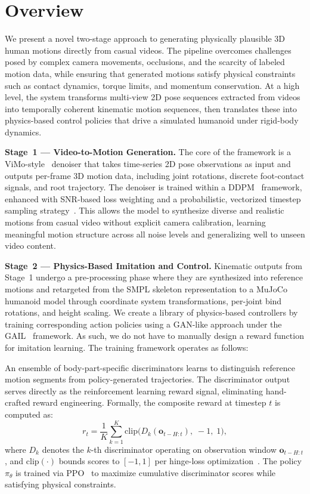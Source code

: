 \section{Overview}
\label{sec:overview}

We present a novel two-stage approach to generating physically plausible 3D human motions directly from casual videos. The pipeline overcomes challenges posed by complex camera movements, occlusions, and the scarcity of labeled motion data, while ensuring that generated motions satisfy physical constraints such as contact dynamics, torque limits, and momentum conservation. At a high level, the system transforms multi-view 2D pose sequences extracted from videos into temporally coherent kinematic motion sequences, then translates these into physics-based control policies that drive a simulated humanoid under rigid-body dynamics.

\textbf{Stage~1 --- Video-to-Motion Generation.} The core of the framework is a ViMo-style~\cite{vimo2024} denoiser that takes time-series 2D pose observations as input and outputs per-frame 3D motion data, including joint rotations, discrete foot-contact signals, and root trajectory. The denoiser is trained within a DDPM~\cite{ddpm2020} framework, enhanced with SNR-based loss weighting and a probabilistic, vectorized timestep sampling strategy~\cite{minsnr2024, ptss2024}. This allows the model to synthesize diverse and realistic motions from casual video without explicit camera calibration, learning meaningful motion structure across all noise levels and generalizing well to unseen video content.

\textbf{Stage~2 --- Physics-Based Imitation and Control.} Kinematic outputs from Stage~1 undergo a pre-processing phase where they are synthesized into reference motions and retargeted from the SMPL skeleton representation to a MuJoCo~\cite{mujoco2012} humanoid model through coordinate system transformations, per-joint bind rotations, and height scaling. We create a library of physics-based controllers by training corresponding action policies using a GAN-like approach under the GAIL~\cite{gail2016} framework. As such, we do not have to manually design a reward function for imitation learning. The training framework operates as follows:

An ensemble of body-part-specific discriminators learns to distinguish reference motion segments from policy-generated trajectories. The discriminator output serves directly as the reinforcement learning reward signal, eliminating hand-crafted reward engineering. Formally, the composite reward at timestep $t$ is computed as:
\begin{equation*}
    r_t = \frac{1}{K}\sum_{k=1}^{K} \mathrm{clip}\bigl(D_k(\mathbf{o}_{t-H:t}),\; -1,\; 1\bigr),
\end{equation*}
where $D_k$ denotes the $k$-th discriminator operating on observation window $\mathbf{o}_{t-H:t}$, and $\mathrm{clip}(\cdot)$ bounds scores to $[-1, 1]$ per hinge-loss optimization~\cite{iccgan2021, wgangp2017}. The policy $\pi_\theta$ is trained via PPO~\cite{ppo2017} to maximize cumulative discriminator scores while satisfying physical constraints.

